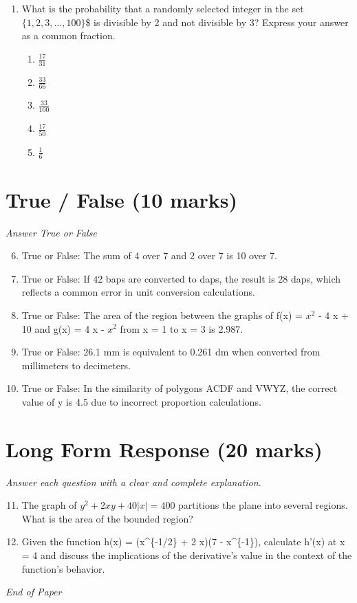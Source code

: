 \documentclass[12pt]{article}
\begin{document}
\begin{enumerate}[label=\arabic*.]
\begin{enumerate}[label=(\alph*)]
    \item 2 x + 2 x and 2 $x^2$
    \item x+x+x+x and $x^4$
    \item 3 x + 5 x and 15 x
    \item 4(2 x - 6) and 8 x - 24
    \item 3 x + 3 x + 3 x and 3 $x^3$
\end{enumerate}
\item What is the probability that a randomly selected integer in the set $\{1,2,3,\ldots,100\}$\$ is divisible by 2 and not divisible by 3? Express your answer as a common fraction.
\begin{enumerate}[label=(\alph*)]
    \item \ensuremath{\frac{17}{31}}
    \item \ensuremath{\frac{33}{66}}
    \item \ensuremath{\frac{33}{100}}
    \item \ensuremath{\frac{17}{50}}
    \item \ensuremath{\frac{1}{6}}
\end{enumerate}
\end{enumerate}

\section*{True / False (10 marks)}
\textit{Answer True or False}
\begin{enumerate}[label=\arabic*.]
\setcounter{enumi}{5}
\item True or False: The sum of 4 over 7 and 2 over 7 is 10 over 7.
\item True or False: If 42 baps are converted to daps, the result is 28 daps, which reflects a common error in unit conversion calculations.
\item True or False: The area of the region between the graphs of f(x) = $x^2$ - 4 x + 10 and g(x) = 4 x - $x^2$ from x = 1 to x = 3 is 2.987.
\item True or False: 26.1 mm is equivalent to 0.261 dm when converted from millimeters to decimeters.
\item True or False: In the similarity of polygons ACDF and VWYZ, the correct value of y is 4.5 due to incorrect proportion calculations.
\end{enumerate}

\section*{Long Form Response (20 marks)}
\textit{Answer each question with a clear and complete explanation.}
\begin{enumerate}[label=\arabic*.]
\setcounter{enumi}{10}
\item The graph of $y^2 + 2 xy + 40|x|= 400$ partitions the plane into several regions. What is the area of the bounded region?
\item Given the function h(x) = (x^\{-1/2\} + 2 x)(7 - x^\{-1\}), calculate h'(x) at x = 4 and discuss the implications of the derivative's value in the context of the function's behavior.
\end{enumerate}

\vfill
\noindent\textit{End of Paper}
\end{document}
